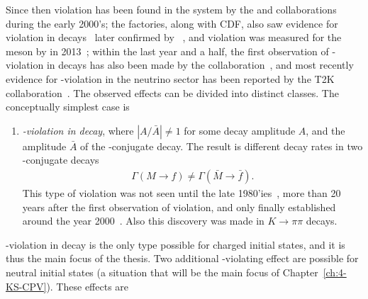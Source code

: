 Since then \CP violation has been found in the \Bz system by the \babar and \belle collaborations~\cite{babarcollaborationObservationMathitCPViolation2001,bellecollaborationObservationLargeMathitCP2001} during the early 2000's; the \B factories, along with CDF, also saw evidence for \CP violation in \Bpm decays~\cite{abeStudyCPCP2006,bellecollaborationEvidenceSuppressedDecay2011,thebabarcollaborationMeasurementCPObservables2010,thebabarcollaborationSearchEnsuremathRightarrowu2010,cdfcollaborationMeasurementsBranchingFraction2010,cdfcollaborationMeasurementsBranchingFraction2011} later confirmed by \lhcb~\cite{LHCb-PAPER-2012-001}, and \CP violation was measured for the \Bs meson by \lhcb in 2013~\cite{LHCb-PAPER-2013-018}; within the last year and a half, the first observation of \CP-violation in \Dz decays has also been made by the \lhcb collaboration~\cite{LHCb-PAPER-2019-006}, and most recently evidence for \CP-violation in the neutrino sector has been reported by the T2K collaboration~\cite{abeConstraintMatterAntimatter2020}. The observed effects can be divided into distinct classes. The conceptually simplest case is
\begin{enumerate}
    \item \emph{\CP-violation in decay}, where $|A / \bar A| \neq 1$ for some decay amplitude $A$, and the amplitude $\bar A$ of the \CP-conjugate decay. The result is different decay rates in two \CP-conjugate decays
    \begin{align}
        \Gamma (M\to f) \neq \Gamma (\bar M \to \bar f).
    \end{align}
    This type of \CP violation was not seen until the late 1980'ies~\cite{gibbonsMeasurementCPviolationParameter1993,barrNewMeasurementDirect1993}, more than 20 years after the first observation of \CP violation, and only finally established around the year 2000~\cite{batleyPrecisionMeasurementDirect2002,ktevcollaborationMeasurementsDirectMathrmCP2003}. Also this discovery was made in $K\to\pi\pi$ decays. 
\end{enumerate}
\CP-violation in decay is the only type possible for charged initial states, and it is thus the main focus of the thesis. Two additional \CP-violating effect are possible for neutral initial states (a situation that will be the main focus of Chapter~\ref{ch:4-KS-CPV}). These effects are
